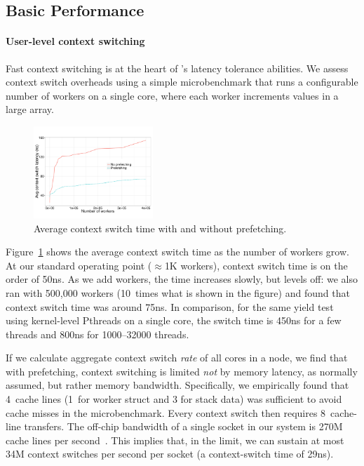 \subsection{Basic \Grappa Performance}
\label{eval:basic}

\paragraph{User-level context switching}

Fast context switching is at the heart of \Grappa's
latency tolerance abilities. We assess context switch overheads using a simple
microbenchmark that runs a configurable number of workers on a single core, where each worker 
increments values in a large array. 

\begin{figure}[ht]
    \begin{center}
      \includegraphics[width=0.4\textwidth]{figs/context_switch_time.pdf}
    \end{center}
    \caption{Average context switch time with and without prefetching.}
    \label{fig:context-switch-exp}
\end{figure}

Figure~\ref{fig:context-switch-exp} shows the average context switch
time as the number of workers grow. At our standard operating point
($\approx$1K workers), context switch time is on the order of
50ns. As we add workers, the time increases slowly, but levels off:
we also ran with 500,000 workers (10~times what is shown in the
figure) and found that context switch time was around 75ns. In
comparison, for the same yield test using kernel-level Pthreads on a
single core, the switch time is 450ns for a few threads and 800ns for
1000--32000 threads.

If we calculate aggregate context switch \emph{rate\/} of all
cores in a node, we find that with prefetching, \Grappa context
switching is
limited \emph{not\/} by memory latency, as normally assumed, but rather memory bandwidth.
Specifically, we empirically found that 4~cache lines (1~for worker
struct and 3 for stack data) was sufficient to avoid cache misses in
the microbenchmark. Every context switch then requires 8~cache-line transfers. The off-chip
bandwidth of a single socket in our system is 270M cache lines per
second~\cite{porterfield:bw,Nelson:hotpar11}. This implies that, in the limit,
we can sustain at most 34M context switches per second per socket (a context-switch time of 29ns).


